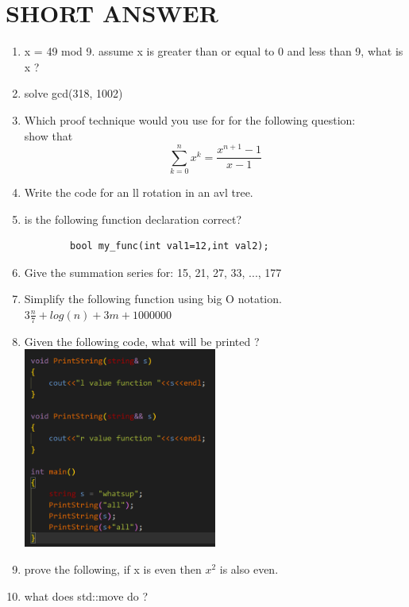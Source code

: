 \documentclass[a4paper]{article}
\begin{document}
\section{SHORT ANSWER}
\begin{enumerate}
    \item  x = 49 mod 9. assume x is greater than or equal to 0 and less than 9, what is x ?  
    \item solve gcd(318, 1002)
    \item Which proof technique would you use for for the following question:\\ show that \[ \sum_{k=0}^{n} x^k = \frac{x^{n+1}-1}{x-1}\]    
    \item Write the code for an ll rotation in an avl tree. 
    \item is the following function declaration correct? \begin{verbatim}
        bool my_func(int val1=12,int val2);
    \end{verbatim}
    \item Give the summation series for: 15, 21, 27, 33, ..., 177
    \item Simplify the following function using big O notation. $3\frac{n}{7} +log(n) +3m +1000000$
    \item Given the following code, what will be printed ?\\ \includegraphics[width=0.5\textwidth]{exam_question.png} 
    \item prove the following, if x is even then $x^2$ is also even. 
    \item what does std::move do ?
\end{enumerate}
\newpage 
\end{document}
